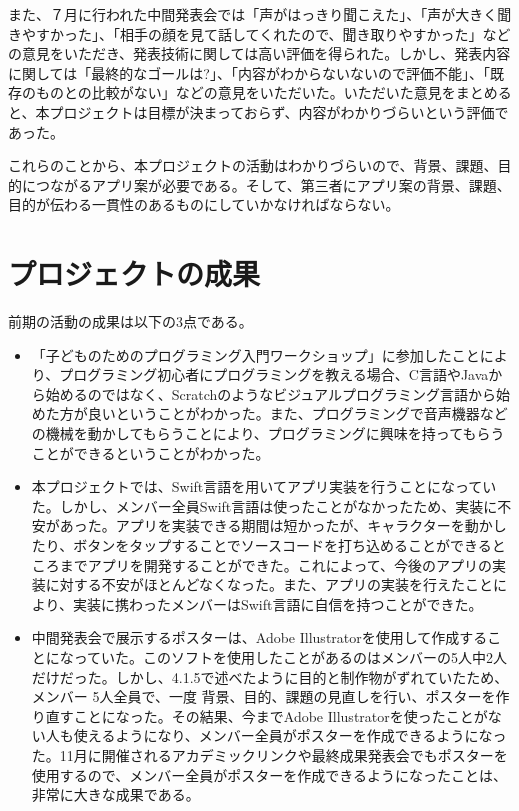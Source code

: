 \documentclass[openany,11pt,papersize]{jsbook}
\begin{document}
また、７月に行われた中間発表会では「声がはっきり聞こえた」、「声が大きく聞きやすかった」、「相手の顔を見て話してくれたので、聞き取りやすかった」などの意見をいただき、発表技術に関しては高い評価を得られた。しかし、発表内容に関しては「最終的なゴールは?」、「内容がわからないないので評価不能」、「既存のものとの比較がない」などの意見をいただいた。いただいた意見をまとめると、本プロジェクトは目標が決まっておらず、内容がわかりづらいという評価であった。

これらのことから、本プロジェクトの活動はわかりづらいので、背景、課題、目的につながるアプリ案が必要である。そして、第三者にアプリ案の背景、課題、目的が伝わる一貫性のあるものにしていかなければならない。

\section{プロジェクトの成果}
\par 前期の活動の成果は以下の3点である。
\begin{itemize}

\item 「子どものためのプログラミング入門ワークショップ」に参加したことにより、プログラミング初心者にプログラミングを教える場合、C言語やJavaから始めるのではなく、Scratchのようなビジュアルプログラミング言語から始めた方が良いということがわかった。また、プログラミングで音声機器などの機械を動かしてもらうことにより、プログラミングに興味を持ってもらうことができるということがわかった。

\item 
本プロジェクトでは、Swift言語を用いてアプリ実装を行うことになっていた。しかし、メンバー全員Swift言語は使ったことがなかったため、実装に不安があった。アプリを実装できる期間は短かったが、キャラクターを動かしたり、ボタンをタップすることでソースコードを打ち込めることができるところまでアプリを開発することができた。これによって、今後のアプリの実装に対する不安がほとんどなくなった。また、アプリの実装を行えたことにより、実装に携わったメンバーはSwift言語に自信を持つことができた。

\item 中間発表会で展示するポスターは、Adobe Illustratorを使用して作成することになっていた。このソフトを使用したことがあるのはメンバーの5人中2人だけだった。しかし、4.1.5で述べたように目的と制作物がずれていたため、メンバー 5人全員で、一度 背景、目的、課題の見直しを行い、ポスターを作り直すことになった。その結果、今までAdobe Illustratorを使ったことがない人も使えるようになり、メンバー全員がポスターを作成できるようになった。11月に開催されるアカデミックリンクや最終成果発表会でもポスターを使用するので、メンバー全員がポスターを作成できるようになったことは、非常に大きな成果である。
\end{itemize}
\end{document}
